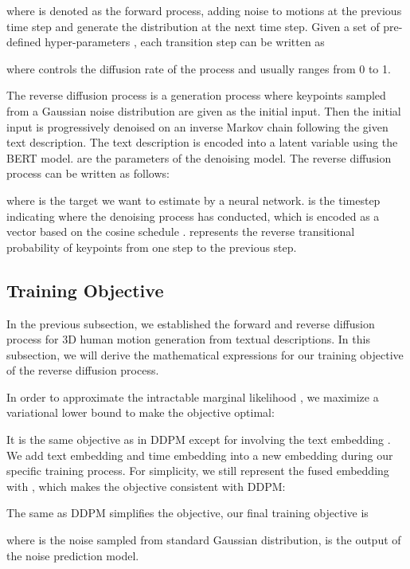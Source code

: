 \documentclass{article}
\begin{document}
where  is denoted as the forward process, adding noise to motions at the previous time step and generate the distribution at the next time step. Given a set of pre-defined hyper-parameters , each transition step can be written as 

where  controls the diffusion rate of the process and usually ranges from 0 to 1.

The reverse diffusion process is a generation process where keypoints sampled from a Gaussian noise distribution  are given as the initial input. Then the initial input is progressively denoised on an inverse Markov chain following the given text description. The text description is encoded into a latent variable  using the BERT \cite{devlin2018bert} model.  are the parameters of the denoising model. The reverse diffusion process can be written as follows:

\vspace{-2mm}

where  is the target we want to estimate by a neural network.  is the timestep indicating where the denoising process has conducted, which is encoded as a vector based on the cosine schedule \cite{nichol2021improved}.  represents the reverse transitional probability of keypoints from one step to the previous step.

\subsection{Training Objective}
In the previous subsection, we established the forward and reverse diffusion process for 3D human motion generation from textual descriptions. In this subsection, we will derive the mathematical expressions for our training objective of the reverse diffusion process. 

In order to approximate the intractable marginal likelihood , we maximize a variational lower bound to make the objective optimal:

It is the same objective as in DDPM \cite{ho2020denoising} except for involving the text embedding . We add text embedding  and time embedding  into a new embedding during our specific training process. For simplicity, we still represent the fused embedding with , which makes the objective consistent with DDPM:

The same as DDPM simplifies the objective, our final training objective is

where  is the noise sampled from standard Gaussian distribution,  is the output of the noise prediction model.
\end{document}
